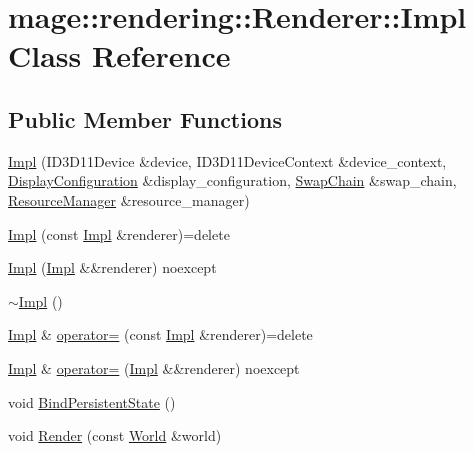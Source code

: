 \hypertarget{classmage_1_1rendering_1_1_renderer_1_1_impl}{}\section{mage\+:\+:rendering\+:\+:Renderer\+:\+:Impl Class Reference}
\label{classmage_1_1rendering_1_1_renderer_1_1_impl}
\subsection*{Public Member Functions}
\begin{DoxyCompactItemize}
\item 
\hyperlink{classmage_1_1rendering_1_1_renderer_1_1_impl_a51ee7e924709bda3d53e73e21352849c}{Impl} (I\+D3\+D11\+Device \&device, I\+D3\+D11\+Device\+Context \&device\+\_\+context, \hyperlink{classmage_1_1rendering_1_1_display_configuration}{Display\+Configuration} \&display\+\_\+configuration, \hyperlink{classmage_1_1rendering_1_1_swap_chain}{Swap\+Chain} \&swap\+\_\+chain, \hyperlink{classmage_1_1rendering_1_1_resource_manager}{Resource\+Manager} \&resource\+\_\+manager)
\item 
\hyperlink{classmage_1_1rendering_1_1_renderer_1_1_impl_a533defdba4bd48054c166ecbb46178f5}{Impl} (const \hyperlink{classmage_1_1rendering_1_1_renderer_1_1_impl}{Impl} \&renderer)=delete
\item 
\hyperlink{classmage_1_1rendering_1_1_renderer_1_1_impl_abc02d1958ce940e8b13d4fe3de3fd05f}{Impl} (\hyperlink{classmage_1_1rendering_1_1_renderer_1_1_impl}{Impl} \&\&renderer) noexcept
\item 
\hyperlink{classmage_1_1rendering_1_1_renderer_1_1_impl_a80064673490a87b9f3cd567e56d3de8f}{$\sim$\+Impl} ()
\item 
\hyperlink{classmage_1_1rendering_1_1_renderer_1_1_impl}{Impl} \& \hyperlink{classmage_1_1rendering_1_1_renderer_1_1_impl_a8eef87ba80c22cba7a2d83db9a740188}{operator=} (const \hyperlink{classmage_1_1rendering_1_1_renderer_1_1_impl}{Impl} \&renderer)=delete
\item 
\hyperlink{classmage_1_1rendering_1_1_renderer_1_1_impl}{Impl} \& \hyperlink{classmage_1_1rendering_1_1_renderer_1_1_impl_a1c40e03347062b200b3e1b214ea7b3ff}{operator=} (\hyperlink{classmage_1_1rendering_1_1_renderer_1_1_impl}{Impl} \&\&renderer) noexcept
\item 
void \hyperlink{classmage_1_1rendering_1_1_renderer_1_1_impl_a86f42e039c290e75378040805533bd41}{Bind\+Persistent\+State} ()
\item 
void \hyperlink{classmage_1_1rendering_1_1_renderer_1_1_impl_a7a5817fc34258bc52731e0c26085d857}{Render} (const \hyperlink{classmage_1_1rendering_1_1_world}{World} \&world)
\end{DoxyCompactItemize}

